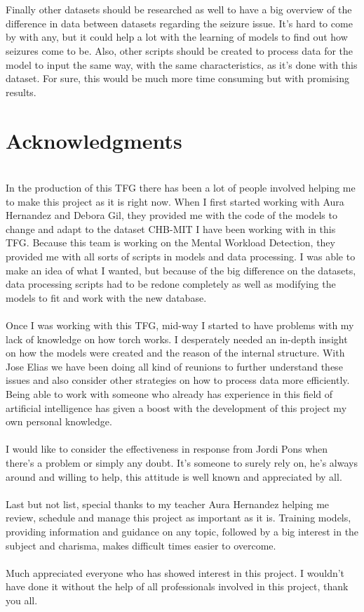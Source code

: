 \\\\
Finally other datasets should be researched as well to have a big overview of the difference in data between datasets regarding the seizure issue. It’s hard to come by with any, but it could help a lot with the learning of models to find out how seizures come to be. Also, other scripts should be created to process data for the model to input the same way, with the same characteristics, as it’s done with this dataset. For sure, this would be much more time consuming but with promising results.
\\

\section{Acknowledgments}
\leavevmode\\
In the production of this TFG there has been a lot of people involved helping me to make this project as it is right now. When I first started working with Aura Hernandez and Debora Gil, they provided me with the code of the models to change and adapt to the dataset CHB-MIT I have been working with in this TFG. Because this team is working on the Mental Workload Detection, they provided me with all sorts of scripts in models and data processing. I was able to make an idea of what I wanted, but because of the big difference on the datasets, data processing scripts had to be redone completely as well as modifying the models to fit and work with the new database.
\\\\
Once I was working with this TFG, mid-way I started to have problems with my lack of knowledge on how torch works. I desperately needed an in-depth insight on how the models were created and the reason of the internal structure. With Jose Elias we have been doing all kind of reunions to further understand these issues and also consider other strategies on how to process data more efficiently. Being able to work with someone who already has experience in this field of artificial intelligence has given a boost with the development of this project my own personal knowledge.
\\\\
I would like to consider the effectiveness in response from Jordi Pons when there’s a problem or simply any doubt. It’s someone to surely rely on, he’s always around and willing to help, this attitude is well known and appreciated by all.
\\\\
Last but not list, special thanks to my teacher Aura Hernandez helping me review, schedule and manage this project as important as it is. Training models, providing information and guidance on any topic, followed by a big interest in the subject and charisma, makes difficult times easier to overcome.
\\\\
Much appreciated everyone who has showed interest in this project. I wouldn’t have done it without the help of all professionals involved in this project, thank you all.
\\